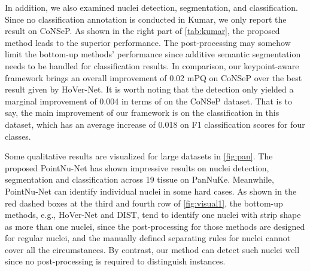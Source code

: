\documentclass[lettersize,journal]{IEEEtran}
\begin{document}
In addition, we also examined nuclei detection, segmentation, and classification. Since no classification annotation is conducted in Kumar, we only report the result on  CoNSeP. As shown in the right part of \autoref{tab:kumar}, the proposed method leads to the  superior performance. The post-processing may somehow limit the bottom-up methods' performance since additive semantic segmentation needs to be handled  for classification results. In comparison, our keypoint-aware framework brings an overall improvement of 0.02 mPQ on CoNSeP over the best result given by HoVer-Net. It is worth noting that the detection only yielded a marginal improvement of 0.004 in terms of  on the CoNSeP dataset. That is to say, the main improvement of our framework is on the classification in this dataset, which has an average increase of 0.018 on F1 classification scores for four classes.  

Some qualitative results are visualized for large datasets in \autoref{fig:pan}. The proposed PointNu-Net has shown impressive results on nuclei detection, segmentation and classification across 19 tissue on PanNuKe. Meanwhile, PointNu-Net can identify individual nuclei in some hard cases. As shown in the red dashed boxes at the third and fourth row of \autoref{fig:visual1}, the bottom-up methods, e.g., HoVer-Net and DIST, tend to identify one nuclei with strip shape as more than one nuclei, since the post-processing for those methods are designed for regular nuclei, and the manually defined separating rules for nuclei cannot cover all the circumstances. By contrast, our method can detect such nuclei well since no post-processing is required to distinguish instances.
\end{document}
